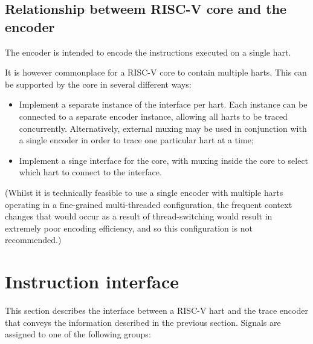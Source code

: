 \subsection{Relationship betweem RISC-V core and the encoder} \label{sec:relationship}

The encoder is intended to encode the instructions executed on a single hart.  

It is however commonplace for a RISC-V core to contain multiple harts.  This can be 
supported by the core in several different ways:

\begin{itemize}
  \item Implement a separate instance of the interface per hart.  Each instance can be connected
    to a separate encoder instance, allowing all harts to be traced concurrently.  Alternatively,
    external muxing may be used in conjunction with a single encoder in order to trace one particular 
    hart at a time;
  \item Implement a singe interface for the core, with muxing inside the core to select which hart to 
  connect to the interface.
\end{itemize}

(Whilst it is technically feasible to use a single encoder with multiple harts operating 
in a fine-grained multi-threaded configuration, the frequent context changes that would occur
as a result of thread-switching would result in extremely poor encoding efficiency, and so
this configuration is not recommended.)

\section{Instruction interface}
This section describes the interface between a RISC-V hart and the
trace encoder that conveys the information described in the previous section.  
Signals are assigned to one of the  following groups:

